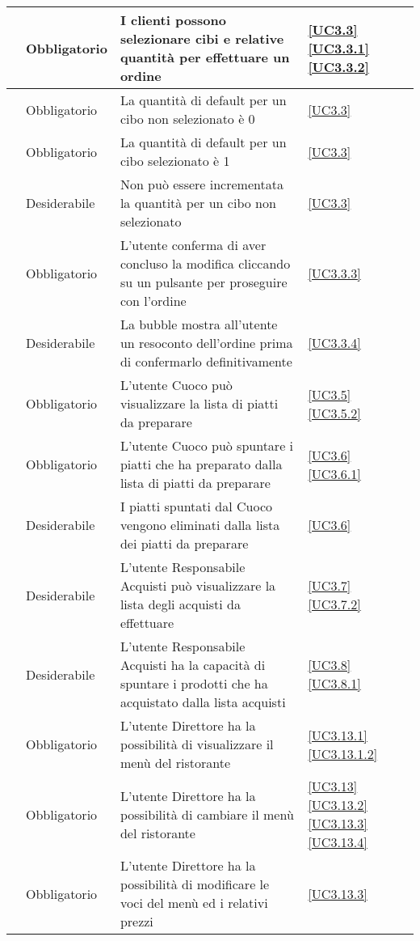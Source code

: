 \begin{longtable}{|P{1.5cm}|P{2.5cm}|P{6.5cm}|P{2.5cm}|}
	\hline \RequisitoObF\label{L24} & Obbligatorio & I clienti possono selezionare cibi e relative quantità per effettuare un ordine & \ref{UC3.3} \ref{UC3.3.1} \ref{UC3.3.2}\\
	\hline \RequisitoObF\label{L69} & Obbligatorio & La quantità di default per un cibo non selezionato è 0 & \ref{UC3.3} \\
	\hline \RequisitoObF\label{L77} & Obbligatorio & La quantità di default per un cibo selezionato è 1 & \ref{UC3.3} \\
	\hline \RequisitoDF\label{L70} & Desiderabile & Non può essere incrementata la quantità per un cibo non selezionato & \ref{UC3.3} \\
	\hline \RequisitoObF\label{L99} & Obbligatorio & L'utente conferma di aver concluso la modifica cliccando su un pulsante per proseguire con l'ordine & \ref{UC3.3.3} \\
	\hline \RequisitoDF\label{L100} & Desiderabile & La bubble mostra all'utente un resoconto dell'ordine prima di confermarlo definitivamente & \ref{UC3.3.4} \\
	\hline \RequisitoObF\label{L25} & Obbligatorio & L'utente Cuoco può visualizzare la lista di piatti da preparare & \ref{UC3.5} \ref{UC3.5.2} \\
	\hline \RequisitoObF\label{L26} & Obbligatorio & L'utente Cuoco può spuntare i piatti che ha preparato dalla lista di piatti da preparare  & \ref{UC3.6} \ref{UC3.6.1} \\
	\hline \RequisitoDF\label{L78} & Desiderabile & I piatti spuntati dal Cuoco vengono eliminati dalla lista dei piatti da preparare & \ref{UC3.6} \\
	\hline \RequisitoDF\label{L27} & Desiderabile & L'utente Responsabile Acquisti può visualizzare la lista degli acquisti da effettuare & \ref{UC3.7} \ref{UC3.7.2} \\
	\hline \RequisitoDF\label{L28} & Desiderabile & L'utente Responsabile Acquisti ha la capacità di spuntare i prodotti che ha acquistato dalla lista acquisti
	 & \ref{UC3.8} \ref{UC3.8.1} \\
	\hline \RequisitoObF\label{L104} & Obbligatorio & L'utente Direttore ha la possibilità di visualizzare il menù del ristorante & \ref{UC3.13.1} \ref{UC3.13.1.2} \\
	\hline \RequisitoObF\label{L105} & Obbligatorio & L'utente Direttore ha la possibilità di cambiare il menù del ristorante & \ref{UC3.13} \ref{UC3.13.2} \ref{UC3.13.3} \ref{UC3.13.4}\\
	\hline \RequisitoObF\label{L29} & Obbligatorio & L'utente Direttore ha la possibilità di modificare le voci del menù ed i relativi prezzi & \ref{UC3.13.3} \\

\end{longtable}
